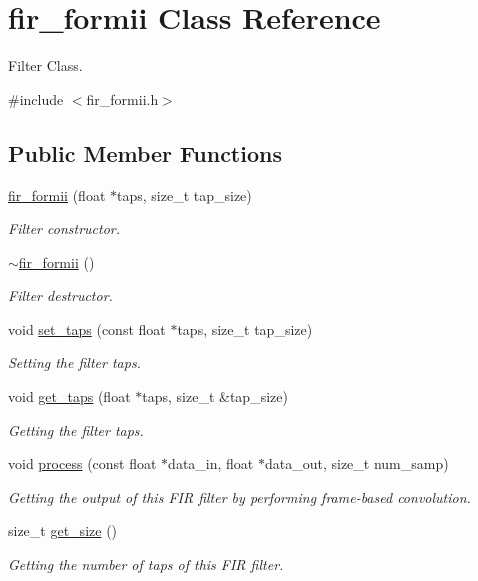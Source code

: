 \hypertarget{classfir__formii}{}\section{fir\+\_\+formii Class Reference}
\label{classfir__formii}


Filter Class.  




{\ttfamily \#include $<$fir\+\_\+formii.\+h$>$}

\subsection*{Public Member Functions}
\begin{DoxyCompactItemize}
\item 
\hyperlink{classfir__formii_a1b2824e6a0f6f9065e86d43676432b37}{fir\+\_\+formii} (float $\ast$taps, size\+\_\+t tap\+\_\+size)
\begin{DoxyCompactList}\small\item\em Filter constructor. \end{DoxyCompactList}\item 
\mbox{\label{classfir__formii_ac9b5d5e8b0a2b2cad69a6b7935e87f19}} 
\hyperlink{classfir__formii_ac9b5d5e8b0a2b2cad69a6b7935e87f19}{$\sim$fir\+\_\+formii} ()
\begin{DoxyCompactList}\small\item\em Filter destructor. \end{DoxyCompactList}\item 
void \hyperlink{classfir__formii_a35f410bda8c31d821ec438707b0bca10}{set\+\_\+taps} (const float $\ast$taps, size\+\_\+t tap\+\_\+size)
\begin{DoxyCompactList}\small\item\em Setting the filter taps. \end{DoxyCompactList}\item 
void \hyperlink{classfir__formii_a11e18bf6b5c6ffcb8979bb0ecf7436e1}{get\+\_\+taps} (float $\ast$taps, size\+\_\+t \&tap\+\_\+size)
\begin{DoxyCompactList}\small\item\em Getting the filter taps. \end{DoxyCompactList}\item 
void \hyperlink{classfir__formii_ac9b081bf01b911fbbbd354e0c3b61e94}{process} (const float $\ast$data\+\_\+in, float $\ast$data\+\_\+out, size\+\_\+t num\+\_\+samp)
\begin{DoxyCompactList}\small\item\em Getting the output of this F\+IR filter by performing frame-\/based convolution. \end{DoxyCompactList}\item 
size\+\_\+t \hyperlink{classfir__formii_af2225fdc109c072f68840975b6e269fd}{get\+\_\+size} ()
\begin{DoxyCompactList}\small\item\em Getting the number of taps of this F\+IR filter. \end{DoxyCompactList}\end{DoxyCompactItemize}


